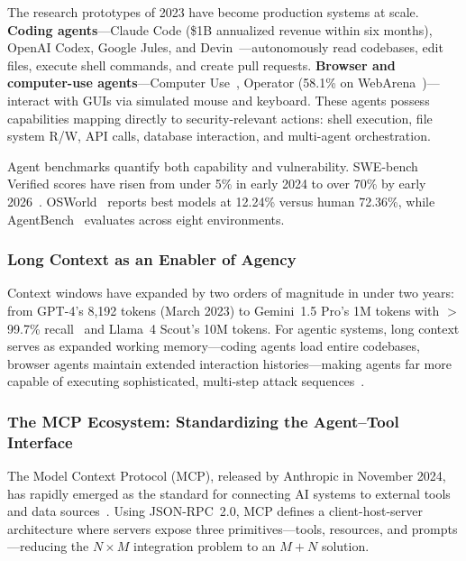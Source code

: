 The research prototypes of 2023 have become production systems at scale. \textbf{Coding agents}---Claude Code (\$1B annualized revenue within six months), OpenAI Codex, Google Jules, and Devin~\cite{cognition2024devin}---autonomously read codebases, edit files, execute shell commands, and create pull requests. \textbf{Browser and computer-use agents}---Computer Use~\cite{anthropic2024computeruse}, Operator (58.1\% on WebArena~\cite{zhou2023webarena})---interact with GUIs via simulated mouse and keyboard. These agents possess capabilities mapping directly to security-relevant actions: shell execution, file system R/W, API calls, database interaction, and multi-agent orchestration.

Agent benchmarks quantify both capability and vulnerability. SWE-bench Verified scores have risen from under 5\% in early 2024 to over 70\% by early 2026~\cite{jimenez2024swebench}. OSWorld~\cite{xie2024osworld} reports best models at 12.24\% versus human 72.36\%, while AgentBench~\cite{liu2024agentbench} evaluates across eight environments.


\subsubsection{Long Context as an Enabler of Agency}
\label{sec:cap-context}

Context windows have expanded by two orders of magnitude in under two years: from GPT-4's 8,192 tokens (March 2023) to Gemini~1.5 Pro's 1M tokens with $>$99.7\% recall~\cite{gemini15} and Llama~4 Scout's 10M tokens. For agentic systems, long context serves as expanded working memory---coding agents load entire codebases, browser agents maintain extended interaction histories---making agents far more capable of executing sophisticated, multi-step attack sequences~\cite{anthropic2024effective}.


\subsubsection{The MCP Ecosystem: Standardizing the Agent--Tool Interface}
\label{sec:cap-mcp}

The Model Context Protocol (MCP), released by Anthropic in November 2024, has rapidly emerged as the standard for connecting AI systems to external tools and data sources~\cite{anthropic2024mcp}. Using JSON-RPC~2.0, MCP defines a client-host-server architecture where servers expose three primitives---tools, resources, and prompts---reducing the $N \times M$ integration problem to an $M+N$ solution.

